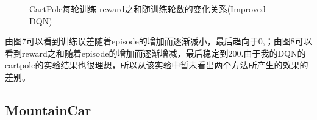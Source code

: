 \documentclass[a4paper,UTF8]{article}
\theoremstyle{definition}
\begin{document}
\begin{figure}[htb]
    \caption{\label{CartPole:4} CartPole每轮训练 reward之和随训练轮数的变化关系(Improved DQN)}
    \end{figure}

由图7可以看到训练误差随着episode的增加而逐渐减小，最后趋向于0,；由图8可以看到reward之和随着episode的增加而逐渐增减，最后稳定到200.由于我的DQN的cartpole的实验结果也很理想，所以从该实验中暂未看出两个方法所产生的效果的差别。

\subsection*{MountainCar}


\end{document}

